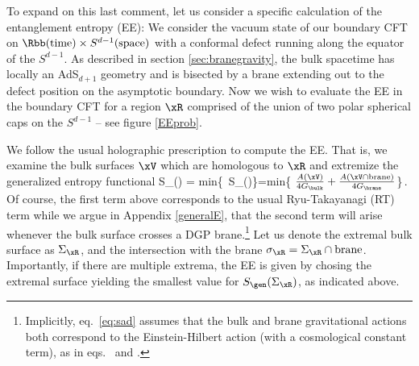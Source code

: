 To expand on this last comment, let us consider a specific calculation of the entanglement entropy (EE): We consider the vacuum state of our boundary CFT on $\Rbb(\text{time})\times S^{d-1}(\text{space})$ with a conformal defect running along the equator of the $S^{d-1}$. As described in section \ref{sec:branegravity}, the bulk spacetime has locally an AdS$_{d+1}$ geometry and is bisected by a brane extending out to the defect position on the asymptotic boundary. Now we wish to evaluate the EE in the boundary CFT for a region $\xR$ comprised of the union of two polar spherical caps on the $S^{d-1}$ -- see figure \ref{EEprob}.
%
\begin{figure}
	\def\svgwidth{0.8\linewidth}
\end{figure}
We follow the usual holographic prescription to compute the EE. That is, we examine the bulk surfaces $\xV$ which are homologous to  $\xR$ and extremize the generalized entropy functional
\beq
 S_\EE(\xR) = {\rm min}\left\{\extr\,
 S_\gen(\xV)\right\}={\rm min}\left\{\extr
  \(
  \frac{A(\xV)}{4 G_\bulk} + \frac{A(\xV \cap {\rm brane})}{4 G_\brane}\)\right\}\,.
 \label{eq:sad}
\eeq
Of course, the first term above corresponds to the usual Ryu-Takayanagi (RT)  term \cite{Ryu:2006bv,Ryu:2006ef} while  we argue in Appendix \ref{generalE}, that the second term will arise whenever the bulk surface crosses a DGP brane.\footnote{Implicitly, eq.~\eqref{eq:sad} assumes that the bulk and brane gravitational actions both correspond to the Einstein-Hilbert action (with a cosmological constant term), as in eqs.~ and .} Let us denote the extremal bulk surface as $\Sigma_\xR$, and the intersection with the brane $\sigma_\xR=\Sigma_\xR \cap {\rm brane}$. Importantly, if there are multiple extrema, the EE is given by chosing the extremal surface yielding the smallest value for $S_\gen(\Sigma_\xR)$, as indicated above.

